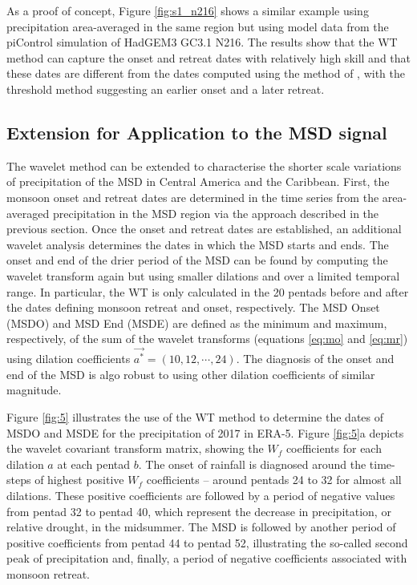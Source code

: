  As a proof of concept, Figure \ref{fig:s1_n216} shows a similar example using precipitation area-averaged in the same region but using model data from the piControl simulation of HadGEM3 GC3.1 N216. 
 The results show that the WT method can capture the onset and retreat dates with relatively high skill and that these dates are different from the dates computed using the method of , with the threshold method suggesting an earlier onset and a later retreat. 

\subsection{Extension for Application to the MSD signal}




The wavelet method can be extended to characterise the shorter scale variations of precipitation of the MSD in Central America and the Caribbean. First, the monsoon onset and retreat dates are determined in the time series from the area-averaged precipitation in the MSD region via the approach described in the previous section. 
Once the onset and retreat dates are established, an additional wavelet analysis determines the dates in which the MSD starts and ends.
The onset and end of the drier period of the MSD can be found by computing the wavelet transform again but using smaller dilations and over a limited temporal range. In particular, the WT is only calculated in the 20 pentads before and after the dates defining monsoon retreat and onset, respectively. The MSD Onset (MSDO) and MSD End (MSDE) are defined as the minimum and maximum, respectively, of the sum of the wavelet transforms (equations \ref{eq:mo} and \ref{eq:mr}) using dilation coefficients $\vec{a^*} = (10,12,\cdots, 24)$.
The diagnosis of the onset and end of the MSD is algo robust to using other dilation coefficients of similar magnitude.

Figure \ref{fig:5} illustrates the use of the WT method to determine the dates of MSDO and MSDE for the precipitation of 2017 in ERA-5.
Figure \ref{fig:5}a depicts the wavelet covariant transform matrix, showing the $W_f$ coefficients for each dilation $a$ at each pentad $b$. The onset of rainfall is diagnosed around the time-steps of highest positive $W_f$ coefficients -- around pentads 24 to 32 for almost all dilations. These positive coefficients are followed by a period of negative values from pentad 32 to pentad 40, which represent the decrease in precipitation, or relative drought, in the midsummer. The MSD is followed by another period of positive coefficients from pentad 44 to pentad 52, illustrating the so-called second peak of precipitation and, finally, a period of negative coefficients associated with monsoon retreat.

